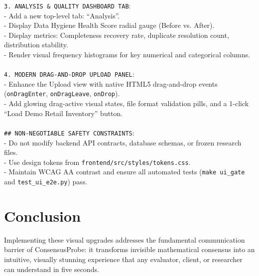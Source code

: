 \documentclass[11pt,a4paper]{article}
\begin{document}
\begin{tcolorbox}[colback=codebg,colframe=primaryblue,title=\textbf{MASTER IMPLEMENTATION PROMPT: ConsensusProbe 2.0 Showcase Upgrade}]
\texttt{3. ANALYSIS \& QUALITY DASHBOARD TAB}:\\
- Add a new top-level tab: ``Analysis''.\\
- Display Data Hygiene Health Score radial gauge (Before vs. After).\\
- Display metrics: Completeness recovery rate, duplicate resolution count, distribution stability.\\
- Render visual frequency histograms for key numerical and categorical columns.\\
\\
\texttt{4. MODERN DRAG-AND-DROP UPLOAD PANEL}:\\
- Enhance the Upload view with native HTML5 drag-and-drop events (\texttt{onDragEnter}, \texttt{onDragLeave}, \texttt{onDrop}).\\
- Add glowing drag-active visual states, file format validation pills, and a 1-click ``Load Demo Retail Inventory'' button.\\
\\
\texttt{\#\# NON-NEGOTIABLE SAFETY CONSTRAINTS}:\\
- Do not modify backend API contracts, database schemas, or frozen research files.\\
- Use design tokens from \texttt{frontend/src/styles/tokens.css}.\\
- Maintain WCAG AA contrast and ensure all automated tests (\texttt{make ui\_gate} and \texttt{test\_ui\_e2e.py}) pass.\\
\end{tcolorbox}

\section{Conclusion}
\label{sec:conclusion}
Implementing these visual upgrades addresses the fundamental communication barrier of ConsensusProbe: it transforms invisible mathematical consensus into an intuitive, visually stunning experience that any evaluator, client, or researcher can understand in five seconds.
\end{document}
